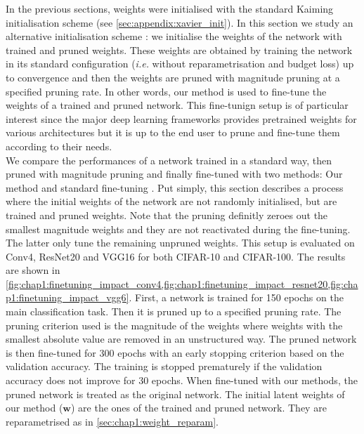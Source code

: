 In the previous sections, weights were initialised with the standard Kaiming
initialisation scheme \cite{DBLP:conf/iccv/HeZRS15} (see
\cref{sec:appendix:xavier_init}). In this section we study an alternative
initialisation scheme : we initialise the weights of the network with trained
and pruned weights. These weights are obtained by training the network in its
standard configuration (\emph{i.e.} without reparametrisation and budget loss)
up to convergence and then the weights are pruned with magnitude pruning at a
specified pruning rate. In other words, our method is used to fine-tune the
weights of a trained and pruned network. This fine-tunign setup is of particular
interest since the major deep learning frameworks
\cite{DBLP:conf/nips/PaszkeGMLBCKLGA19,DBLP:journals/corr/AbadiABBCCCDDDG16}
provides pretrained weights for various architectures \cite{pytorch_vision} but
it is up to the end user to prune and fine-tune them according to their needs.\\

We compare the performances of a network trained in a standard way, then pruned
with magnitude pruning and finally fine-tuned with two methods: Our method and
standard fine-tuning \cite{DBLP:conf/nips/HanPTD15}. Put simply, this section
describes a process where the initial weights of the network are not randomly
initialised, but are trained and pruned weights. Note that the pruning definitly
zeroes out the smallest magnitude weights and they are not reactivated during
the fine-tuning. The latter only tune the remaining unpruned weights. This setup
is evaluated on Conv4, ResNet20 and VGG16 for both CIFAR-10 and CIFAR-100. The
results are shown in
\cref{fig:chap1:finetuning_impact_conv4,fig:chap1:finetuning_impact_resnet20,fig:chap1:finetuning_impact_vgg6}.
First, a network is trained for 150 epochs on the main classification task. Then
it is pruned up to a specified pruning rate. The pruning criterion used is the
magnitude of the weights where weights with the smallest absolute value are
removed in an unstructured way. The pruned network is then fine-tuned for 300
epochs with an early stopping criterion based on the validation accuracy. The
training is stopped prematurely if the validation accuracy does not improve for
30 epochs. When fine-tuned with our methods, the pruned network is treated as
the original network. The initial latent weights of our method ($\mathbf{w}$)
are the ones of the trained and pruned network. They are reparametrised as in
\ref{sec:chap1:weight_reparam}.\\

